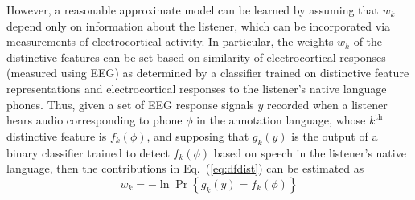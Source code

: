 However, a reasonable approximate model can be learned by assuming
that $w_k$ depend only on information about the listener, which can be
incorporated via measurements of electrocortical activity. In
particular, the weights $w_k$ of the distinctive features can be set
based on similarity of electrocortical responses (measured using EEG)
as determined by a classifier trained on distinctive feature
representations and electrocortical responses to the listener's native
language phones. Thus, given a set of EEG response signals $y$
recorded when a listener hears audio corresponding to phone $\phi$ in
the annotation language, whose $k^\textrm{th}$ distinctive feature is
$f_k(\phi)$, and supposing that $g_k(y)$ is the output of a
binary classifier trained to detect $f_k(\phi)$ based on speech in the
listener's native language\cite{Liberto15}, then the contributions in
Eq.~(\ref{eq:dfdist}) can be estimated as
\begin{equation}
  w_k = -\ln\Pr\left\{g_k(y)= f_k(\phi)\right\}
  \label{eq:eegdist}
\end{equation}

